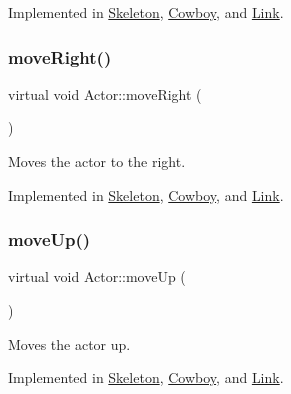 Implemented in \mbox{\hyperlink{classSkeleton_ab03c65cdabc94f280443691653112d3a}{Skeleton}}, \mbox{\hyperlink{classCowboy_a487cf6b5d1e37586e6e9b408d2aaad1a}{Cowboy}}, and \mbox{\hyperlink{classLink_a682bab2dc3f967e35a67dcc74c1d4722}{Link}}.

\mbox{\label{classActor_a9176d8f8ec68fcbd91c48223e7c65775}} 
\subsubsection{\texorpdfstring{moveRight()}{moveRight()}}
{\footnotesize\ttfamily virtual void Actor\+::move\+Right (\begin{DoxyParamCaption}{ }\end{DoxyParamCaption})\hspace{0.3cm}{\ttfamily [pure virtual]}}



Moves the actor to the right. 



Implemented in \mbox{\hyperlink{classSkeleton_a3d8ce7b8a1d10e4a33a27f0eee54042e}{Skeleton}}, \mbox{\hyperlink{classCowboy_a2094d31b2535a25ef8a40945473cf884}{Cowboy}}, and \mbox{\hyperlink{classLink_aa1d60136a88be20a14179a5760ed91da}{Link}}.

\mbox{\label{classActor_afaa299f90233461ee4df96dcfda3008a}} 
\subsubsection{\texorpdfstring{moveUp()}{moveUp()}}
{\footnotesize\ttfamily virtual void Actor\+::move\+Up (\begin{DoxyParamCaption}{ }\end{DoxyParamCaption})\hspace{0.3cm}{\ttfamily [pure virtual]}}



Moves the actor up. 



Implemented in \mbox{\hyperlink{classSkeleton_a0ddbea7574ada0b5cef0cadbd4a0dd9f}{Skeleton}}, \mbox{\hyperlink{classCowboy_a3c4b0540c47492d02fa64b4740a35bcf}{Cowboy}}, and \mbox{\hyperlink{classLink_a850a1e6c7a68d921b36d30dc918a7668}{Link}}.

